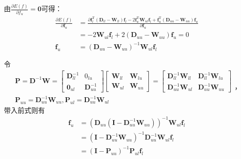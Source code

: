 {\[\]
由$ \frac{\partial E(f)}{\partial f_{u}}=\mathbf{0} $可得：
\[ \begin{aligned} \frac{\partial E(f)}{\partial \boldsymbol{f}_{u}} & =\frac{\partial \boldsymbol{f}_{l}^{\mathrm{T}}\left(\boldsymbol{D}_{l l}-\boldsymbol{W}_{l l}\right) \boldsymbol{f}_{l}-2 \boldsymbol{f}_{u}^{\mathrm{T}} \boldsymbol{W}_{u l} \boldsymbol{f}_{l}+\boldsymbol{f}_{u}^{\mathrm{T}}\left(\boldsymbol{D}_{u u}-\boldsymbol{W}_{u u}\right) \boldsymbol{f}_{u}}{\partial \boldsymbol{f}_{u}} \\ & =-2 \boldsymbol{W}_{u l} \boldsymbol{f}_{l}+2\left(\boldsymbol{D}_{u u}-\boldsymbol{W}_{u u}\right) \boldsymbol{f}_{u} = 0 \\
\boldsymbol{f}_{u}&=\left(\mathbf{D}_{u u}-\mathbf{W}_{u u}\right)^{-1} \mathbf{W}_{u l} \boldsymbol{f}_{l}\end{aligned} \]

令\[
\begin{array}{c}\mathbf{P}=\mathbf{D}^{-1} \mathbf{W}=\left[\begin{array}{cc}\mathbf{D}_{l l}^{-1} & 0_{l u} \\ \mathbf{0}_{u l} & \mathbf{D}_{u u}^{-1}\end{array}\right]\left[\begin{array}{cc}\mathbf{W}_{l l} & \mathbf{W}_{l u} \\ \mathbf{W}_{u l} & \mathbf{W}_{u u}\end{array}\right]=\left[\begin{array}{cc}\mathbf{D}_{l l}^{-1} \mathbf{W}_{l l} & \mathbf{D}_{l l}^{-1} \mathbf{W}_{l u} \\ \mathbf{D}_{u u}^{-1} \mathbf{W}_{u l} & \mathbf{D}_{u u}^{-1} \mathbf{W}_{u u}\end{array}\right] \\ \mathbf{P}_{u u}=\mathbf{D}_{u u}^{-1} \mathbf{W}_{u u}, \mathbf{P}_{u l}=\mathbf{D}_{u u}^{-1} \mathbf{W}_{u l}\end{array}，
\]带入前式则有\[
\begin{aligned} \boldsymbol{f}_{u} & =\left(\boldsymbol{D}_{u u}\left(\boldsymbol{I}-\boldsymbol{D}_{u u}^{-1} \boldsymbol{W}_{u u}\right)\right)^{-1} \boldsymbol{W}_{u l} \boldsymbol{f}_{l} \\ & =\left(\boldsymbol{I}-\boldsymbol{D}_{u u}^{-1} \boldsymbol{W}_{u u}\right)^{-1} \boldsymbol{D}_{u u}^{-1} \boldsymbol{W}_{u l} \boldsymbol{f}_{l} \\ & =\left(\boldsymbol{I}-\boldsymbol{P}_{u u}\right)^{-1} \boldsymbol{P}_{u l} \boldsymbol{f}_{l}\end{aligned}
\]
}

